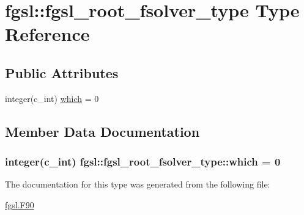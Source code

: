 \hypertarget{structfgsl_1_1fgsl__root__fsolver__type}{\section{fgsl\-:\-:fgsl\-\_\-root\-\_\-fsolver\-\_\-type Type Reference}
\label{structfgsl_1_1fgsl__root__fsolver__type}
}
\subsection*{Public Attributes}
\begin{DoxyCompactItemize}
\item 
integer(c\-\_\-int) \hyperlink{structfgsl_1_1fgsl__root__fsolver__type_a501d75f08ad98d21274d2b56212b8610}{which} = 0
\end{DoxyCompactItemize}


\subsection{Member Data Documentation}
\hypertarget{structfgsl_1_1fgsl__root__fsolver__type_a501d75f08ad98d21274d2b56212b8610}{
\subsubsection[{which}]{\setlength{\rightskip}{0pt plus 5cm}integer(c\-\_\-int) fgsl\-::fgsl\-\_\-root\-\_\-fsolver\-\_\-type\-::which = 0}}\label{structfgsl_1_1fgsl__root__fsolver__type_a501d75f08ad98d21274d2b56212b8610}


The documentation for this type was generated from the following file\-:\begin{DoxyCompactItemize}
\item 
\hyperlink{fgsl_8F90}{fgsl.\-F90}\end{DoxyCompactItemize}
